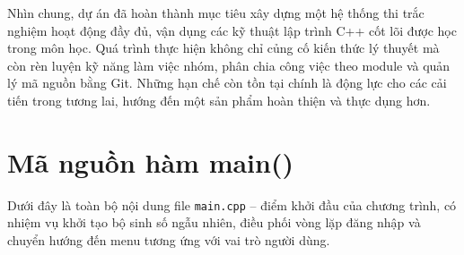 \documentclass[11pt]{report}
\begin{document}
Nhìn chung, dự án đã hoàn thành mục tiêu xây dựng một hệ thống thi trắc nghiệm hoạt động đầy đủ, vận dụng các kỹ thuật lập trình C++ cốt lõi được học trong môn học. Quá trình thực hiện không chỉ củng cố kiến thức lý thuyết mà còn rèn luyện kỹ năng làm việc nhóm, phân chia công việc theo module và quản lý mã nguồn bằng Git. Những hạn chế còn tồn tại chính là động lực cho các cải tiến trong tương lai, hướng đến một sản phẩm hoàn thiện và thực dụng hơn.

\cleardoublepage
\nocite{*}



\appendix
\chapter{Mã nguồn hàm main()}

Dưới đây là toàn bộ nội dung file \texttt{main.cpp} -- điểm khởi đầu của chương trình, có nhiệm vụ khởi tạo bộ sinh số ngẫu nhiên, điều phối vòng lặp đăng nhập và chuyển hướng đến menu tương ứng với vai trò người dùng.
\end{document}
